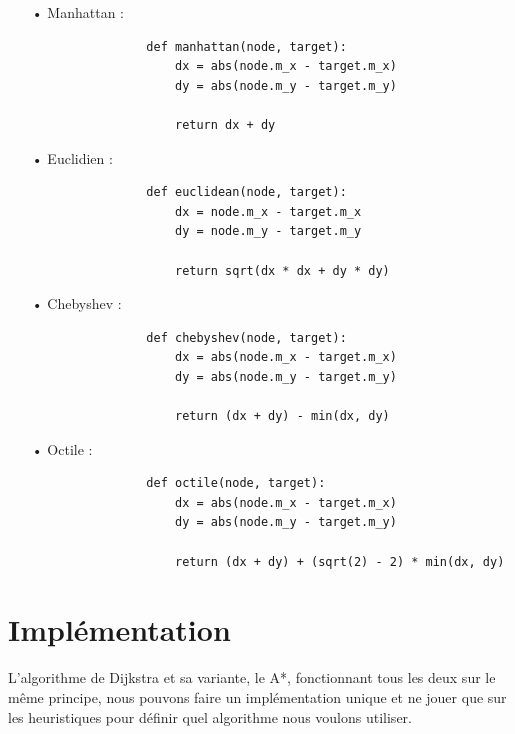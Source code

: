 \documentclass{report}
\begin{document}
	\begin{itemize}
		\item[•] Manhattan : 
			\begin{lstlisting}
				def manhattan(node, target):
					dx = abs(node.m_x - target.m_x)
					dy = abs(node.m_y - target.m_y)
					
					return dx + dy
            \end{lstlisting}
		\item[•] Euclidien : 
			\begin{lstlisting}
				def euclidean(node, target):
				    dx = node.m_x - target.m_x
				    dy = node.m_y - target.m_y
				    
				    return sqrt(dx * dx + dy * dy)
            \end{lstlisting}
		\item[•] Chebyshev : 
			\begin{lstlisting}
				def chebyshev(node, target):
					dx = abs(node.m_x - target.m_x)
					dy = abs(node.m_y - target.m_y)
					
					return (dx + dy) - min(dx, dy)
            \end{lstlisting}
		\item[•] Octile :
			\begin{lstlisting}
				def octile(node, target):
        			dx = abs(node.m_x - target.m_x)
        			dy = abs(node.m_y - target.m_y)

        			return (dx + dy) + (sqrt(2) - 2) * min(dx, dy)
            \end{lstlisting} 
	\end{itemize}
	
	\newpage
	\section{Implémentation}
	L'algorithme de Dijkstra et sa variante, le A*, fonctionnant tous les deux sur le même principe, nous pouvons faire un implémentation unique et ne jouer que sur les heuristiques pour définir quel algorithme nous voulons utiliser.\\
	
\end{document}
